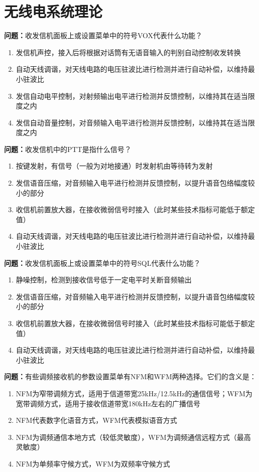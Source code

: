 \chapter{无线电系统理论}




\noindent\textbf{问题：}收发信机面板上或设置菜单中的符号VOX代表什么功能？
\begin{enumerate}[label=\Alph*), leftmargin=3em]
\item 发信机声控，接入后将根据对话筒有无语音输入的判别自动控制收发转换
\item 自动天线调谐，对天线电路的电压驻波比进行检测并进行自动补偿，以维持最小驻波比
\item 发信自动电平控制，对射频输出电平进行检测并反馈控制，以维持其在适当限度之内
\item 发信自动音量控制，对音频输入电平进行检测并反馈控制，以维持其在适当限度之内
\end{enumerate}

\bigskip


\noindent\textbf{问题：}收发信机中的PTT是指什么信号？
\begin{enumerate}[label=\Alph*), leftmargin=3em]
\item 按键发射，有信号（一般为对地接通）时发射机由等待转为发射
\item 发信语音压缩，对音频输入电平进行检测并反馈控制，以提升语音包络幅度较小的部分
\item 收信机前置放大器，在接收微弱信号时接入（此时某些技术指标可能低于额定值）
\item 自动天线调谐，对天线电路的电压驻波比进行检测并进行自动补偿，以维持最小驻波比
\end{enumerate}

\bigskip


\noindent\textbf{问题：}收发信机面板上或设置菜单中的符号SQL代表什么功能？
\begin{enumerate}[label=\Alph*), leftmargin=3em]
\item 静噪控制，检测到接收信号低于一定电平时关断音频输出
\item 发信语音压缩，对音频输入电平进行检测并反馈控制，以提升语音包络幅度较小的部分
\item 收信机前置放大器，在接收微弱信号时接入（此时某些技术指标可能低于额定值）
\item 自动天线调谐，对天线电路的电压驻波比进行检测并进行自动补偿，以维持最小驻波比
\end{enumerate}

\bigskip


\noindent\textbf{问题：}有些调频接收机的参数设置菜单有NFM和WFM两种选择。它们的含义是：
\begin{enumerate}[label=\Alph*), leftmargin=3em]
\item NFM为窄带调频方式，适用于信道带宽25kHz/12.5kHz的通信信号；WFM为宽带调频方式，适用于接收信道带宽180kHz左右的广播信号
\item NFM代表数字化语音方式，WFM代表模拟语音方式
\item NFM为调频通信本地方式（较低灵敏度），WFM为调频通信远程方式（最高灵敏度）
\item NFM为单频率守候方式，WFM为双频率守候方式
\end{enumerate}

